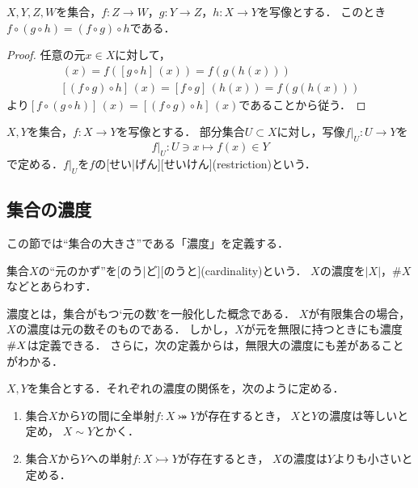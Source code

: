 \documentclass[../sotsu.tex]{subfiles}
\begin{document}
\begin{proposition}
    \label{thm:map-is-associative}
    $X, Y, Z, W$を集合，$f \colon Z \to W$，$g \colon Y \to Z$，$h \colon X \to Y$を写像とする．
    このとき$f \circ (g \circ h) = (f \circ g) \circ h$である．
\end{proposition}

\begin{proof}
    任意の元$x \in X$に対して，
    \begin{gather*}
        [f \circ (g \circ h)] \, (x)
            = f([g \circ h] \, (x))
            = f(g(h(x)))
        \\
        [(f \circ g) \circ h] \, (x)
            = [f \circ g] \, (h(x))
            = f(g(h(x)))
    \end{gather*}
    より$[f \circ (g \circ h)] \, (x) = [(f \circ g) \circ h] \, (x)$であることから従う．
\end{proof}


\begin{definition}[写像の制限]
    \label{dfn:restriction}
    $X, Y$を集合，$f \colon X \to Y$を写像とする．
    部分集合$U \subset X$に対し，写像$f \vert_{U} \colon U \to Y$を
    \begin{equation*}
        f \vert_U  \colon  U \ni x \longmapsto f(x) \in Y
    \end{equation*}
    で定める．$f \vert_U$を$f$の[せい|げん][せいけん](restriction)という．
\end{definition}


\subsection{集合の濃度}

この節では``集合の大きさ''である「濃度」を定義する．

\begin{definition}
    集合$X$の``元のかず''を[のう|ど][のうと](cardinality)という．
    $X$の濃度を$\lvert X \rvert$，$\# X$などとあらわす．
\end{definition}

濃度とは，集合がもつ`元の数'を一般化した概念である．
$X$が有限集合の場合，$X$の濃度は元の数そのものである．
しかし，$X$が元を無限に持つときにも濃度$\# X$は定義できる．
さらに，次の定義からは，無限大の濃度にも差があることがわかる．

\begin{definition}[濃度の大小]
    $X, Y$を集合とする．それぞれの濃度の関係を，次のように定める．
    \begin{enumerate}
        \item 集合$X$から$Y$の間に全単射$f \colon X \twoheadrightarrowtail Y$が存在するとき，
            $X$と$Y$の濃度は等しいと定め，
            $X \sim Y$とかく．
        \item 集合$X$から$Y$への単射$f \colon X \rightarrowtail Y$が存在するとき，
            $X$の濃度は$Y$よりも小さいと定める．
    \end{enumerate}
\end{definition}
\end{document}
